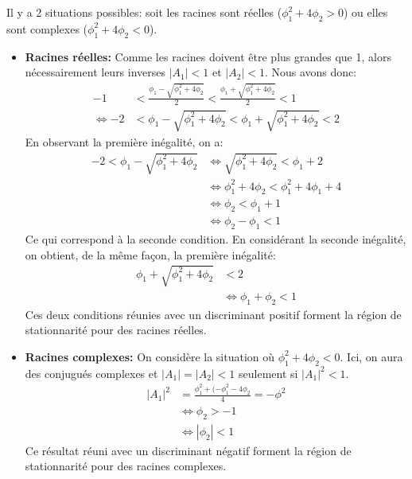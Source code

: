 \begin{exercice}
\begin{sol}
Il y a 2 situations possibles: soit les racines sont réelles ($\phi_1^2+4\phi_2>0$) ou elles sont complexes ($\phi_1^2+4\phi_2<0$).
\begin{itemize}
\item \textbf{Racines réelles:}
Comme les racines doivent être plus grandes que 1, alors nécessairement leurs inverses $|A_1|<1$ et $|A_2|<1$. Nous avons donc:
\begin{align*}
-1 &< \frac{\phi_1-\sqrt{\phi_1^2+4\phi_2}}{2} <  \frac{\phi_1+\sqrt{\phi_1^2+4\phi_2}}{2} < 1 \\
\Leftrightarrow -2 &< \phi_1-\sqrt{\phi_1^2+4\phi_2} < \phi_1+\sqrt{\phi_1^2+4\phi_2} < 2
\end{align*}
En observant la première inégalité, on a:
\begin{align*}
-2 < \phi_1-\sqrt{\phi_1^2+4\phi_2}
&\Leftrightarrow \sqrt{\phi_1^2+4\phi_2}<\phi_1+2 \\
&\Leftrightarrow \phi_1^2+4\phi_2 < \phi_1^2+4\phi_1+4 \\
&\Leftrightarrow \phi_2 < \phi_1 + 1 \\
&\Leftrightarrow \phi_2 - \phi_1 < 1
\end{align*}
Ce qui correspond à la seconde condition. En considérant la seconde inégalité, on obtient, de la même façon, la première inégalité:
\begin{align*}
\phi_1+\sqrt{\phi_1^2+4\phi_2} &< 2 \\
&\Leftrightarrow \phi_1 + \phi_2 < 1
\end{align*}
Ces deux conditions réunies avec un discriminant positif forment la région de stationnarité pour des racines réelles.

\item \textbf{Racines complexes:}  
On considère la situation où $\phi_1^2+4\phi_2<0$. Ici, on aura des conjugués complexes et $|A_1| = |A_2| <1$ seulement si $|A_1|^2<1$.
\begin{align*}
|A_1|^2 &=\frac{\phi_1^2+(-\phi_1^2-4\phi_2}{4}=-\phi^2 \\
&\Leftrightarrow \phi_2>-1 \\
&\Leftrightarrow |\phi_2|<1
\end{align*}
Ce résultat réuni avec un discriminant négatif forment la région de stationnarité pour des racines complexes.
\end{itemize}
\end{sol}
\end{exercice}





